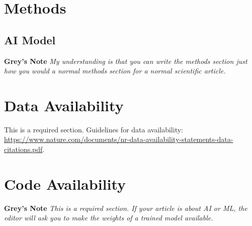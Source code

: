 \documentclass[pdflatex]{sn-jnl}
\begin{document}
\let\oldthebibliography=\thebibliography
\let\oldendthebibliography=\endthebibliography
\renewenvironment{thebibliography}[1]{
    \oldthebibliography{#1}
    \setcounter{enumiv}{34}
}{\oldendthebibliography}

\newpage
\unnumbered

\unnumbered
\section{Methods}
\subsection{AI Model}
\textbf{Grey's Note} \textit{My understanding is that you can write the methods section just how you would a normal methods section for a normal scientific article.}


\section*{Data Availability}
This is a required section. Guidelines for data availability: \url{https://www.nature.com/documents/nr-data-availability-statements-data-citations.pdf}.

\section*{Code Availability}
\textbf{Grey's Note} \textit{This is a required section. If your article is about AI or ML, the editor will ask you to make the weights of a trained model available.}
\end{document}
